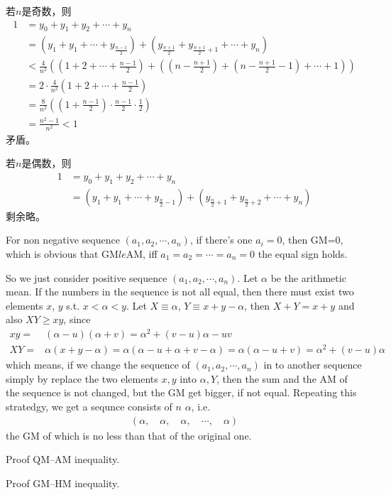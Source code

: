 若$n$是奇数，则
\begin{align*}
  1&=y_0+y_1+y_2+\cdots+y_n\\
  &=\left(y_1+y_1+\cdots+y_{\frac{n-1}2}\right)
  + \left(y_{\frac{n+1}2}+y_{\frac{n+1}2+1}+\cdots+y_n\right)\\
  & <\frac4{n^2}\left(
  \left(1+2+\cdots+\frac{n-1}2\right) +
  \left( \left(n-\frac{n+1}2\right) + \left(n-\frac{n+1}2-1\right) + \cdots + 1\right)
  \right)\\
  &=2\cdot\frac4{n^2}\left(1+2+\cdots+\frac{n-1}2\right)\\
  &=\frac8{n^2}\left( \left(1+\frac{n-1}2\right)\cdot\frac{n-1}2\cdot\frac12 \right)\\
  &=\frac{n^2-1}{n^2}<1
\end{align*}
矛盾。

若$n$是偶数，则
\begin{align*}
  1&=y_0+y_1+y_2+\cdots+y_n\\
  &=\left(y_1+y_1+\cdots+y_{\frac{n}2-1}\right)
  + \left(y_{\frac{n}2+1}+y_{\frac{n}2+2}+\cdots+y_n\right)
\end{align*}
剩余略。



\begin{example}[Proof GM $le$ AM]
  For non negative sequence $(a_1, a_2, \cdots, a_n)$, if there's one $a_i=0$, then GM=0, which is obvious that GM$le$AM, iff $a_1=a_2=\cdots=a_n=0$ the equal sign holds.

  So we just consider positive sequence $(a_1, a_2, \cdots, a_n)$. Let $\alpha$ be the arithmetic mean. If the numbers in the sequence is not all equal, then there must exist two elements $x$, $y$ s.t. $x < \alpha < y$.
  Let $X\equiv\alpha$, $Y\equiv  x+y-\alpha$, then $X+Y=x+y$ and also $XY\ge xy$, since
  \begin{align*}
    xy=&(\alpha-u)(\alpha+v)=\alpha^2+(v-u)\alpha-uv\\
    XY=&\alpha(x+y-\alpha)=\alpha(\alpha-u+\alpha+v-\alpha)=\alpha(\alpha-u+v)=\alpha^2+(v-u)\alpha
  \end{align*}
  which means, if we change the sequence of $(a_1,a_2,\cdots,a_n)$ in to another sequence simply by replace the two elements $x, y$ into $\alpha, Y$, then the sum and the AM of the sequence is not changed, but the GM get bigger, if not equal. Repeating this stratedgy, we get a sequnce consists of $n$ $\alpha$, i.e.
  \begin{align*}
    (\alpha,\quad \alpha,\quad \alpha,\quad \cdots,\quad \alpha)
  \end{align*}
  the GM of which is no less than that of the original one.
\end{example}

\begin{question}
  Proof QM--AM inequality.
\end{question}

\begin{question}
  Proof GM--HM inequality.
\end{question}

